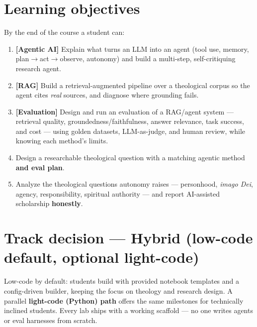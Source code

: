 \documentclass[11pt]{article}
\newcommand{\pillar}[1]{{\small\color{accent}\textbf{[#1]}}}
\begin{document}
\section{Learning objectives}
By the end of the course a student can:
\begin{enumerate}[leftmargin=1.6em,itemsep=2pt]
  \item \pillar{Agentic AI} Explain what turns an LLM into an agent (tool use, memory, plan$\rightarrow$act$\rightarrow$observe,
    autonomy) and build a multi-step, self-critiquing research agent.
  \item \pillar{RAG} Build a retrieval-augmented pipeline over a theological corpus so the agent cites
    \emph{real} sources, and diagnose where grounding fails.
  \item \pillar{Evaluation} Design and run an evaluation of a RAG/agent system --- retrieval quality,
    groundedness/faithfulness, answer relevance, task success, and cost --- using golden datasets,
    LLM-as-judge, and human review, while knowing each method's limits.
  \item Design a researchable theological question with a matching agentic method \textbf{and eval plan}.
  \item Analyze the theological questions autonomy raises --- personhood, \emph{imago Dei}, agency,
    responsibility, spiritual authority --- and report AI-assisted scholarship \textbf{honestly}.
\end{enumerate}

\section{Track decision --- Hybrid (low-code default, optional light-code)}
Low-code by default: students build with provided notebook templates and a config-driven builder,
keeping the focus on theology and research design. A parallel \textbf{light-code (Python) path} offers
the same milestones for technically inclined students. Every lab ships with a working scaffold ---
no one writes agents or eval harnesses from scratch.

\end{document}
